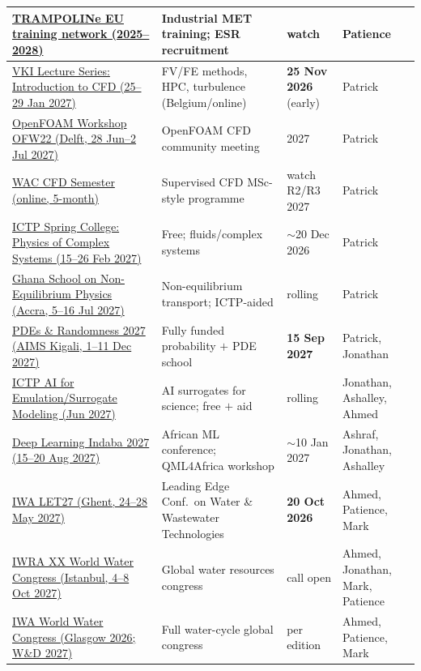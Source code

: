 \documentclass[11pt,a4paper]{article}
\begin{document}
\begin{longtable}{@{}p{3.4cm}p{5.6cm}p{2.2cm}p{2.7cm}@{}}
\midrule
\href{https://water.imdea.org/bioe-project/trampoline/}{TRAMPOLINe EU training network (2025--2028)} & Industrial MET training; ESR recruitment & watch & Patience \\
\midrule
\href{https://ls.vki.ac.be/store/lsdetails/229/introduction-to-computational-fluid-dynamics-2027}{VKI Lecture Series: Introduction to CFD (25--29 Jan 2027)} & FV/FE methods, HPC, turbulence (Belgium/online) & \textbf{25 Nov 2026} (early) & Patrick \\
\midrule
\href{https://ofw22.carrd.co/}{OpenFOAM Workshop OFW22 (Delft, 28 Jun--2 Jul 2027)} & OpenFOAM CFD community meeting & 2027 & Patrick \\
\midrule
\href{https://www.world-academies.com/cfd-education-semester/}{WAC CFD Semester (online, 5-month)} & Supervised CFD MSc-style programme & watch R2/R3 2027 & Patrick \\
\midrule
\href{https://www.ictp.it/home/scientific-calendar}{ICTP Spring College: Physics of Complex Systems (15--26 Feb 2027)} & Free; fluids/complex systems & $\sim$20 Dec 2026 & Patrick \\
\midrule
\href{https://indico.ictp.it/event/11443/}{Ghana School on Non-Equilibrium Physics (Accra, 5--16 Jul 2027)} & Non-equilibrium transport; ICTP-aided & rolling & Patrick \\
\midrule
\href{https://sy-m.org/pdes-and-randomness.html}{PDEs \& Randomness 2027 (AIMS Kigali, 1--11 Dec 2027)} & Fully funded probability $+$ PDE school & \textbf{15 Sep 2027} & Patrick, Jonathan \\
\midrule
\href{https://www.ictp.it/home/scientific-calendar}{ICTP AI for Emulation/Surrogate Modeling (Jun 2027)} & AI surrogates for science; free $+$ aid & rolling & Jonathan, Ashalley, Ahmed \\
\midrule
\href{https://deeplearningindaba.com/}{Deep Learning Indaba 2027 (15--20 Aug 2027)} & African ML conference; QML4Africa workshop & $\sim$10 Jan 2027 & Ashraf, Jonathan, Ashalley \\
\midrule
\href{https://ebnet.ac.uk/iwa-let27-abstracts-deadline/}{IWA LET27 (Ghent, 24--28 May 2027)} & Leading Edge Conf.\ on Water \& Wastewater Technologies & \textbf{20 Oct 2026} & Ahmed, Patience, Mark \\
\midrule
\href{https://www.iwra.org/events/world-water-congress/}{IWRA XX World Water Congress (Istanbul, 4--8 Oct 2027)} & Global water resources congress & call open & Ahmed, Jonathan, Mark, Patience \\
\midrule
\href{https://worldwatercongress.org/}{IWA World Water Congress (Glasgow 2026; W\&D 2027)} & Full water-cycle global congress & per edition & Ahmed, Patience, Mark \\

\end{longtable}
\end{document}
